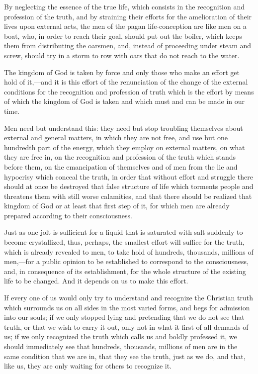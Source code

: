 \documentclass{book}
\begin{document}
By neglecting the essence of the true life, which consists in the recognition and profession of the truth, and by straining their efforts for the amelioration of their lives upon external acts, the men of the pagan life-conception are like men on a boat, who, in order to reach their goal, should put out the boiler, which keeps them from distributing the oarsmen, and, instead of proceeding under steam and screw, should try in a storm to row with oars that do not reach to the water.

The kingdom of God is taken by force and only those who make an effort get hold of it,—and it is this effort of the renunciation of the change of the external conditions for the recognition and profession of truth which is the effort by means of which the kingdom of God is taken and which must and can be made in our time.

Men need but understand this: they need but stop troubling themselves about external and general matters, in which they are not free, and use but one hundredth part of the energy, which they employ on external matters, on what they are free in, on the recognition and profession of the truth which stands before them, on the emancipation of themselves and of men from the lie and hypocrisy which conceal the truth, in order that without effort and struggle there should at once be destroyed that false structure of life which torments people and threatens them with still worse calamities, and that there should be realized that kingdom of God or at least that first step of it, for which men are already prepared according to their consciousness.

Just as one jolt is sufficient for a liquid that is saturated with salt suddenly to become crystallized, thus, perhaps, the smallest effort will suffice for the truth, which is already revealed to men, to take hold of hundreds, thousands, millions of men,—for a public opinion to be established to correspond to the consciousness, and, in consequence of its establishment, for the whole structure of the existing life to be changed. And it depends on us to make this effort.

If every one of us would only try to understand and recognize the Christian truth which surrounds us on all sides in the most varied forms, and begs for admission into our souls; if we only stopped lying and pretending that we do not see that truth, or that we wish to carry it out, only not in what it first of all demands of us; if we only recognized the truth which calls us and boldly professed it, we should immediately see that hundreds, thousands, millions of men are in the same condition that we are in, that they see the truth, just as we do, and that, like us, they are only waiting for others to recognize it.
\end{document}
